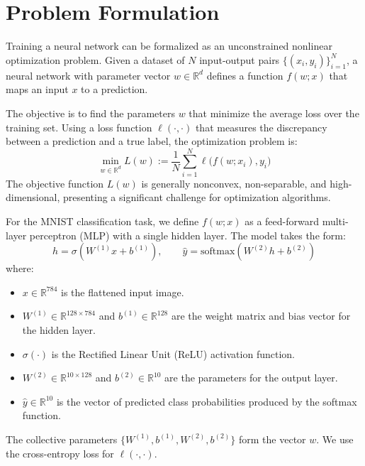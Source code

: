 \documentclass[20pt]{article}
\begin{document}
\clearpage

\section{Problem Formulation} \label{formulation}
Training a neural network can be formalized as an unconstrained nonlinear optimization problem. Given a dataset of $N$ input-output pairs $\{(x_i, y_i)\}_{i=1}^N$, a neural network with parameter vector $w \in \mathbb{R}^d$ defines a function $f(w; x)$ that maps an input $x$ to a prediction.

The objective is to find the parameters $w$ that minimize the average loss over the training set. Using a loss function $\ell(\cdot, \cdot)$ that measures the discrepancy between a prediction and a true label, the optimization problem is:
\begin{equation}\label{eq:training-objective}
\min_{w \in \mathbb{R}^d} L(w) := \frac{1}{N}\sum_{i=1}^N \ell\big(f(w; x_i), y_i\big)
\end{equation}
The objective function $L(w)$ is generally nonconvex, non-separable, and high-dimensional, presenting a significant challenge for optimization algorithms.

For the MNIST classification task, we define $f(w; x)$ as a feed-forward multi-layer perceptron (MLP) with a single hidden layer. The model takes the form:
\begin{equation}\label{eq:network-def}
h = \sigma(W^{(1)} x + b^{(1)}), \qquad \hat{y} = \mathrm{softmax}(W^{(2)} h + b^{(2)})
\end{equation}
where:
\begin{itemize}
    \item $x \in \mathbb{R}^{784}$ is the flattened input image.
    \item $W^{(1)} \in \mathbb{R}^{128 \times 784}$ and $b^{(1)} \in \mathbb{R}^{128}$ are the weight matrix and bias vector for the hidden layer.
    \item $\sigma(\cdot)$ is the Rectified Linear Unit (ReLU) activation function.
    \item $W^{(2)} \in \mathbb{R}^{10 \times 128}$ and $b^{(2)} \in \mathbb{R}^{10}$ are the parameters for the output layer.
    \item $\hat{y} \in \mathbb{R}^{10}$ is the vector of predicted class probabilities produced by the softmax function.
\end{itemize}
The collective parameters $\{W^{(1)}, b^{(1)}, W^{(2)}, b^{(2)}\}$ form the vector $w$. We use the cross-entropy loss for $\ell(\cdot, \cdot)$.
\end{document}
